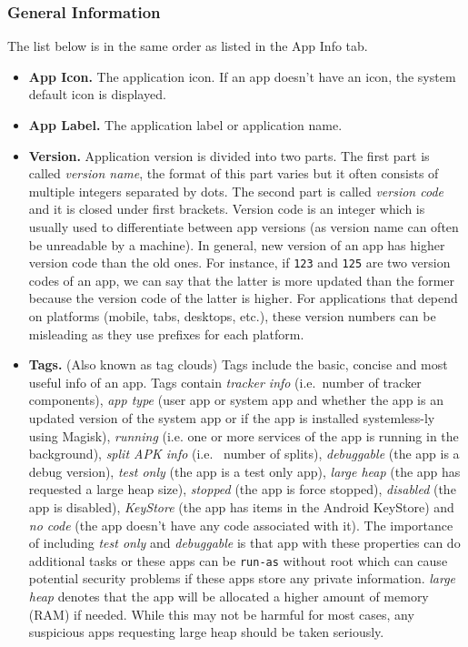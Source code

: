 \subsubsection{General Information}\label{subsubsec:app-info-general-information}
The list below is in the same order as listed in the App Info tab.
\begin{itemize}
    \item \textbf{App Icon.} The application icon. If an app doesn't have an icon, the system default icon is displayed.

    \item \textbf{App Label.} The application label or application name.

    \item \textbf{Version.} Application version is divided into two parts. The first part is called \textit{version
    name}, the format of this part varies but it often consists of multiple integers separated by dots. The second part
    is called \textit{version code} and it is closed under first brackets. Version code is an integer which is usually
    used to differentiate between app versions (as version name can often be unreadable by a machine). In general, new
    version of an app has higher version code than the old ones. For instance, if \texttt{123} and \texttt{125} are two
    version codes of an app, we can say that the latter is more updated than the former because the version code of the
    latter is higher. For applications that depend on platforms (mobile, tabs, desktops, etc.), these version numbers
    can be misleading as they use prefixes for each platform.

    \item \textbf{Tags.} (Also known as tag clouds) Tags include the basic, concise and most useful info of an app. Tags
    contain \textit{tracker info} (i.e.\ number of tracker components), \textit{app type} (user app or system app and
    whether the app is an updated version of the system app or if the app is installed systemless-ly using Magisk),
    \textit{running} (i.e. one or more services of the app is running in the background), \textit{split APK info} (i.e.
    \ number of splits), \textit{debuggable} (the app is a debug version), \textit{test only} (the app is a test only
    app), \textit{large heap} (the app has requested a large heap size), \textit{stopped} (the app is force stopped),
    \textit{disabled} (the app is disabled), \textit{KeyStore} (the app has items in the Android KeyStore) and
    \textit{no code} (the app doesn't have any code associated with it). The importance of including \textit{test only}
    and \textit{debuggable} is that app with these properties can do additional tasks or these apps can be
    \texttt{run-as} without root which can cause potential security problems if these apps store any private
    information. \textit{large heap} denotes that the app will be allocated a higher amount of memory (RAM) if needed.
    While this may not be harmful for most cases, any suspicious apps requesting large heap should be taken seriously.


\end{itemize}
